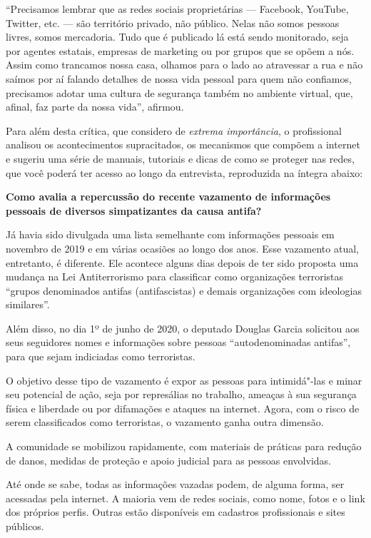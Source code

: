 ``Precisamos lembrar que as redes sociais proprietárias --- Facebook,
YouTube, Twitter, etc. --- são território privado, não público. Nelas não
somos pessoas livres, somos mercadoria. Tudo que é publicado lá está
sendo monitorado, seja por agentes estatais, empresas de marketing ou
por grupos que se opõem a nós. Assim como trancamos nossa casa, olhamos
para o lado ao atravessar a rua e não saímos por aí falando detalhes de
nossa vida pessoal para quem não confiamos, precisamos adotar uma cultura
de segurança também no ambiente virtual, que, afinal, faz parte da nossa
vida'', afirmou.

Para além desta crítica, que considero de \emph{extrema importância},
o profissional analisou os acontecimentos supracitados, os mecanismos
que compõem a internet e sugeriu uma série de manuais, tutoriais e dicas
de como se proteger nas redes, que você poderá ter acesso ao longo da
entrevista, reproduzida na íntegra abaixo:

\pagebreak

\noindent{}\textbf{Como avalia a repercussão do recente vazamento de informações
pessoais de diversos simpatizantes da causa antifa? }

Já havia sido divulgada uma lista semelhante com
informações pessoais em novembro de 2019 e em várias ocasiões ao longo
dos anos. Esse vazamento atual, entretanto, é diferente. Ele acontece
alguns dias depois de ter sido proposta uma mudança na Lei
Antiterrorismo para classificar como organizações terroristas ``grupos
denominados antifas (antifascistas) e demais organizações com ideologias
similares''.

Além disso, no dia 1º de junho de 2020, o deputado Douglas Garcia
solicitou aos seus seguidores nomes e informações sobre pessoas
``autodenominadas antifas'', para que sejam indiciadas como terroristas.

O objetivo desse tipo de vazamento é expor as pessoas para intimidá"-las
e minar seu potencial de ação, seja por represálias no trabalho, ameaças
à sua segurança física e liberdade ou por difamações e ataques na
internet. Agora, com o risco de serem classificados como terroristas, o
vazamento ganha outra dimensão.

A comunidade se mobilizou rapidamente, com materiais de práticas para
redução de danos, medidas de proteção e apoio judicial para as pessoas
envolvidas.

Até onde se sabe, todas as informações vazadas podem, de alguma forma, ser
acessadas pela internet. A maioria vem de redes sociais, como nome,
fotos e o link dos próprios perfis. Outras estão disponíveis em
cadastros profissionais e sites públicos.

